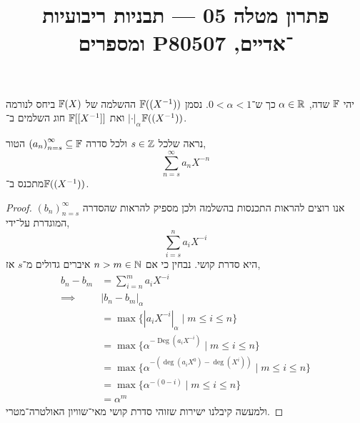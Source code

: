 
\title{פתרון מטלה 05 --- תבניות ריבועיות ומספרים P־אדיים, 80507}

\DeclareMathOperator{\Deg}{Deg}



\maketitle
\maketitleprint[red]

\question{}
יהי $\mathbb{F}$ שדה, $\alpha \in \mathbb{R}$ כך ש־$0 < \alpha < 1$.
נסמן $\mathbb{F}((X^{-1}))$ ההשלמה של $\mathbb{F}(X)$ ביחס לנורמה $| \cdot |_{\alpha}$ ואת $\mathbb{F}[[X^{-1}]]$ חוג השלמים ב־$\mathbb{F}((X^{-1}))$.

\subquestion{}
נראה שלכל $s \in \mathbb{Z}$ ולכל סדרה ${(a_n)}_{n = s}^{\infty} \subseteq \mathbb{F}$ הטור,
\[
	\sum_{n = s}^\infty a_n X^{-n}
\]
מתכנס ב־$\mathbb{F}((X^{-1}))$.
\begin{proof}
	אנו רוצים להראות התכנסות בהשלמה ולכן מספיק להראות שהסדרה ${(b_n)}_{n = s}^{\infty}$ המוגדרת על־ידי,
	\[
		\sum_{i = s}^n a_i X^{-i}
	\]
	היא סדרת קושי.
	נבחין כי אם $n > m \in \mathbb{N}$ איברים גדולים מ־$s$ אז,
	\begin{align*}
		b_n - b_m
		& = \sum_{i = n}^m a_i X^{-i} \\
		\implies & |b_n - b_m|_{\alpha} \\
		& = \max\{ |a_i X^{-i}|_{\alpha} \mid m \le i \le n \} \\
		& = \max\{ \alpha^{-\Deg(a_i X^{-i})} \mid m \le i \le n \} \\
		& = \max\{ \alpha^{-(\deg(a_i X^{0}) - \deg(X^i))} \mid m \le i \le n \} \\
		& = \max\{ \alpha^{-(0 - i)} \mid m \le i \le n \} \\
		& = \alpha^m
	\end{align*}
	ולמעשה קיבלנו ישירות שזוהי סדרת קושי מאי־שוויון האולטרה־מטרי.
\end{proof}

